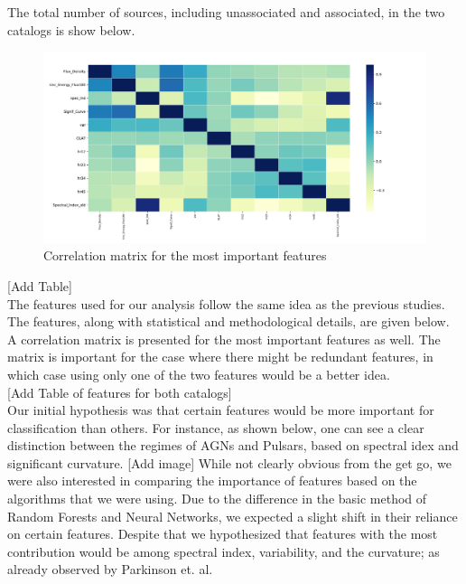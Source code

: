 The total number of sources, including unassociated and associated, in the two catalogs is show below. \\
\begin{figure}[h]
\includegraphics[width=\onepic\textwidth]{plots/correlation.pdf}
\caption{Correlation matrix for the most important features}
\label{fig:corr}
\end{figure}
[Add Table]\\

The features used for our analysis follow the same idea as the previous studies. The features, along with statistical and methodological details, are given below. A correlation matrix is presented for the most important features as well. The matrix is important for the case where there might be redundant features, in which case using only one of the two features would be a better idea.\\


[Add Table of features for both catalogs]\\

Our initial hypothesis was that certain features would be more important for classification than others. For instance, as shown below, one can see a clear distinction between the regimes of AGNs and Pulsars, based on spectral idex and significant curvature. [Add image] While not clearly obvious from the get go, we were also interested in comparing the importance of features based on the algorithms that we were using. Due to the difference in the basic method of Random Forests and Neural Networks, we expected a slight shift in their reliance on certain features. Despite that we hypothesized that features with the most contribution would be among spectral index, variability, and the curvature; as already observed by Parkinson et. al.\\


\subsection{}


